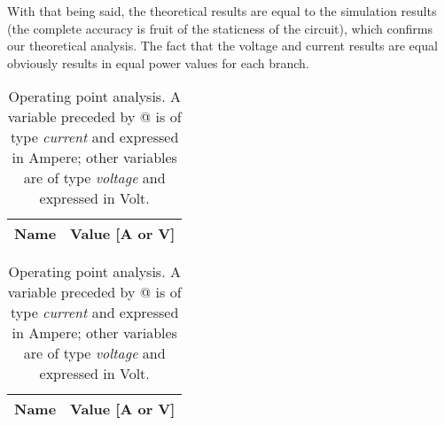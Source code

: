 With that being said, the theoretical results are equal to the simulation results (the complete accuracy is fruit of the staticness of the circuit), which confirms our theoretical analysis. The fact that the voltage and current results are equal obviously results in equal power values for each branch.

\begin{table}[h]
  \centering
  \begin{tabular}{|l|r|}
    \hline    
    {\bf Name} & {\bf Value [A or V]} \\ \hline
    
  \end{tabular}
  \caption{Operating point analysis. A variable preceded by @ is of type {\em current}
    and expressed in Ampere; other variables are of type {\it voltage} and expressed in
    Volt.}
  \label{tab:op}
\end{table}

\begin{table}[h]
  \centering
  \begin{tabular}{|l|r|}
    \hline    
    {\bf Name} & {\bf Value [A or V]} \\ \hline
    
  \end{tabular}
  \caption{Operating point analysis. A variable preceded by @ is of type {\em current}
    and expressed in Ampere; other variables are of type {\it voltage} and expressed in
    Volt.}
  \label{tab:op2}
\end{table}
